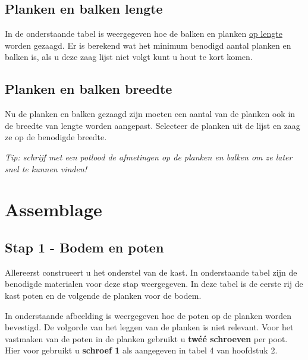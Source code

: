 \documentclass{article}
\begin{document}
\subsection{Planken en balken lengte}

In de onderstaande tabel is weergegeven hoe de balken en planken \underline{op lengte} worden gezaagd. Er is berekend wat het minimum benodigd aantal planken en balken is, als u deze zaag lijst niet volgt kunt u hout te kort komen.





\subsection{Planken en balken breedte}

Nu de planken en balken gezaagd zijn moeten een aantal van de planken ook in de breedte van lengte worden aangepast. Selecteer de planken uit de lijst en zaag ze op de benodigde breedte. \\

\begin{center}
    \textit{Tip: schrijf met een potlood de afmetingen op de planken en balken om ze later snel te kunnen vinden!}
\end{center}



\clearpage
\newpage

\section{Assemblage}

\subsection{Stap 1 - Bodem en poten}

Allereerst construeert u het onderstel van de kast. In onderstaande tabel zijn de benodigde materialen voor deze stap weergegeven. In deze tabel is de eerste rij de kast poten en de volgende de planken voor de bodem.



In onderstaande afbeelding is weergegeven hoe de poten op de planken worden bevestigd. De volgorde van het leggen van de planken is niet relevant. Voor het vastmaken van de poten in de planken gebruikt u \textbf{tw\'{e}\'{e} schroeven} per poot. Hier voor gebruikt u \textbf{schroef 1} als aangegeven in tabel 4 van hoofdstuk 2.
\end{document}
